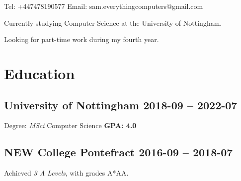 \documentclass[cv.tex]{subfiles}
\begin{document}
\title{}
\author{Sam Robert Whitehead}

\maketitle

\pagestyle{empty}

Tel:
+447478190577
\hfill
Email:
sam.everythingcomputers@gmail.com

\vspace{2mm}
Currently studying Computer Science at the University of Nottingham.

Looking for part-time work during my fourth year.
\section{Education}
    \subsection{University of Nottingham
        \hfill 2018-09 -- 2022-07}
        Degree: \emph{MSci} Computer Science
        \hfill
        \textbf{GPA: 4.0}
    \subsection{NEW College Pontefract
        \hfill 2016-09 -- 2018-07}
        Achieved \emph{3 A Levels}, with grades
        A*AA\footnotemark[2].
\end{document}
